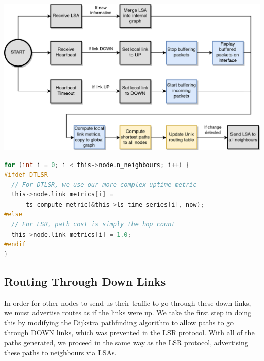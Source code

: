 \documentclass[withindex,glossary,openany]{cam-thesis}
\begin{document}
\begin{center}
\begin{minipage}{0.9\textwidth} \centering
	\includegraphics[width=1\textwidth]{flowchart_dtlsr}
	\label{fig:flowchart_dtlsr}
\end{minipage}
\end{center}

\begin{minipage}{1\textwidth} \centering
\begin{lstlisting}[language=C, label=preprocessor_switch, frame=tb, caption=Example of preprocessor switch for DTLSR modifications]
for (int i = 0; i < this->node.n_neighbours; i++) {
#ifdef DTLSR
  // For DTLSR, we use our more complex uptime metric
  this->node.link_metrics[i] =
      ts_compute_metric(&this->ls_time_series[i], now);
#else
  // For LSR, path cost is simply the hop count
  this->node.link_metrics[i] = 1.0;
#endif
}
\end{lstlisting}
\end{minipage}

\subsection{Routing Through Down Links}

In order for other nodes to send us their traffic to go through these down links, we must advertise routes as if the links were up. We take the first step in doing this by modifying the Dijkstra pathfinding algorithm to allow paths to go through DOWN links, which was prevented in the LSR protocol. With all of the paths generated, we proceed in the same way as the LSR protocol, advertising these paths to neighbours via LSAs.
\end{document}
